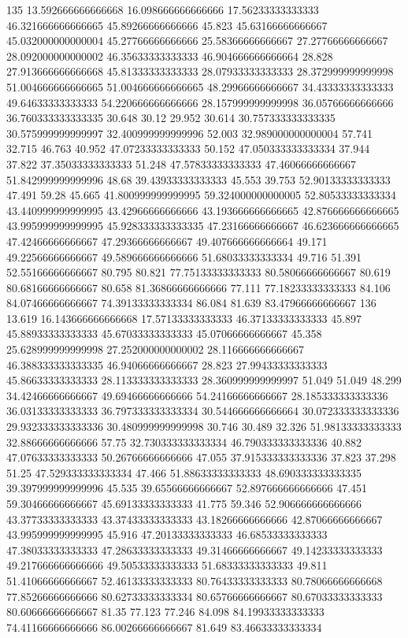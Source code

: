 135 13.592666666666668 16.098666666666666 17.56233333333333 46.321666666666665 45.89266666666666 45.823 45.63166666666667 45.032000000000004 45.27766666666666 25.58366666666667 27.27766666666667 28.092000000000002 46.35633333333333 46.904666666666664 28.828 27.913666666666668 45.81333333333333 28.07933333333333 28.372999999999998 51.004666666666665 51.004666666666665 48.29966666666667 34.43333333333333 49.64633333333333 54.220666666666666 28.157999999999998 36.05766666666666 36.760333333333335 30.648 30.12 29.952 30.614 30.757333333333335 30.575999999999997 32.400999999999996 52.003 32.989000000000004 57.741 32.715 46.763 40.952 47.07233333333333 50.152 47.050333333333334 37.944 37.822 37.35033333333333 51.248 47.57833333333333 47.46066666666667 51.842999999999996 48.68 39.43933333333333 45.553 39.753 52.90133333333333 47.491 59.28 45.665 41.800999999999995 59.324000000000005 52.80533333333334 43.440999999999995 43.42966666666666 43.193666666666665 42.876666666666665 43.995999999999995 45.928333333333335 47.23166666666667 46.623666666666665 47.42466666666667 47.29366666666667 49.407666666666664 49.171 49.22566666666667 49.589666666666666 51.68033333333334 49.716 51.391 52.55166666666667 80.795 80.821 77.75133333333333 80.58066666666667 80.619 80.68166666666667 80.658 81.36866666666666 77.111 77.18233333333333 84.106 84.07466666666667 74.39133333333334 86.084 81.639 83.47966666666667
136 13.619 16.143666666666668 17.57133333333333 46.37133333333333 45.897 45.88933333333333 45.67033333333333 45.07066666666667 45.358 25.628999999999998 27.252000000000002 28.116666666666667 46.388333333333335 46.94066666666667 28.823 27.99433333333333 45.86633333333333 28.113333333333333 28.360999999999997 51.049 51.049 48.299 34.42466666666667 49.69466666666666 54.24166666666667 28.185333333333336 36.03133333333333 36.797333333333334 30.544666666666664 30.072333333333336 29.932333333333336 30.480999999999998 30.746 30.489 32.326 51.98133333333333 32.88666666666666 57.75 32.730333333333334 46.790333333333336 40.882 47.07633333333333 50.26766666666666 47.055 37.915333333333336 37.823 37.298 51.25 47.529333333333334 47.466 51.88633333333333 48.690333333333335 39.397999999999996 45.535 39.65566666666667 52.897666666666666 47.451 59.30466666666667 45.69133333333333 41.775 59.346 52.906666666666666 43.37733333333333 43.37433333333333 43.18266666666666 42.87066666666667 43.995999999999995 45.916 47.20133333333333 46.68533333333333 47.38033333333333 47.28633333333333 49.31466666666667 49.14233333333333 49.217666666666666 49.50533333333333 51.68333333333333 49.811 51.41066666666667 52.46133333333333 80.76433333333333 80.78066666666668 77.85266666666666 80.62733333333334 80.65766666666667 80.67033333333333 80.60666666666667 81.35 77.123 77.246 84.098 84.19933333333333 74.41166666666666 86.00266666666667 81.649 83.46633333333334
